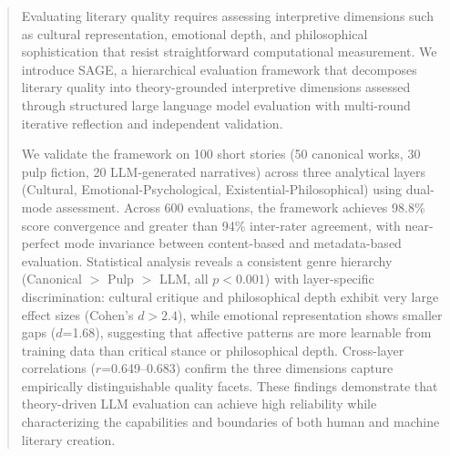\begin{abstract}

Evaluating literary quality requires assessing interpretive dimensions such as cultural representation, emotional depth, and philosophical sophistication that resist straightforward computational measurement. We introduce SAGE, a hierarchical evaluation framework that decomposes literary quality into theory-grounded interpretive dimensions assessed through structured large language model evaluation with multi-round iterative reflection and independent validation.

We validate the framework on 100 short stories (50 canonical works, 30 pulp fiction, 20 LLM-generated narratives) across three analytical layers (Cultural, Emotional-Psychological, Existential-Philosophical) using dual-mode assessment. Across 600 evaluations, the framework achieves 98.8\% score convergence and greater than 94\% inter-rater agreement, with near-perfect mode invariance between content-based and metadata-based evaluation. Statistical analysis reveals a consistent genre hierarchy (Canonical $>$ Pulp $>$ LLM, all $p<0.001$) with layer-specific discrimination: cultural critique and philosophical depth exhibit very large effect sizes (Cohen's $d>2.4$), while emotional representation shows smaller gaps ($d$=1.68), suggesting that affective patterns are more learnable from training data than critical stance or philosophical depth. Cross-layer correlations ($r$=0.649--0.683) confirm the three dimensions capture empirically distinguishable quality facets. These findings demonstrate that theory-driven LLM evaluation can achieve high reliability while characterizing the capabilities and boundaries of both human and machine literary creation.

\end{abstract}
